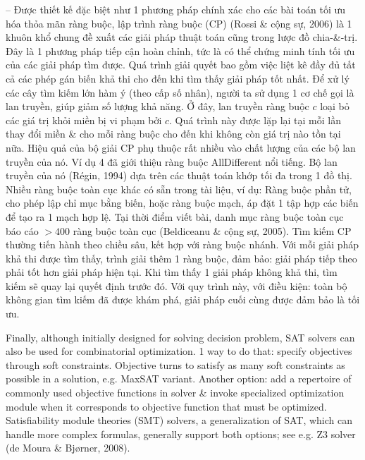 \documentclass{article}
\begin{document}
\begin{itemize}
\begin{itemize}
\begin{itemize}
\begin{itemize}
                -- Được thiết kế đặc biệt như 1 phương pháp chính xác cho các bài toán tối ưu hóa thỏa mãn ràng buộc, lập trình ràng buộc (CP) (Rossi \& cộng sự, 2006) là 1 khuôn khổ chung đề xuất các giải pháp thuật toán cũng trong lược đồ chia-\&-trị. Đây là 1 phương pháp tiếp cận hoàn chỉnh, tức là có thể chứng minh tính tối ưu của các giải pháp tìm được. Quá trình giải quyết bao gồm việc liệt kê đầy đủ tất cả các phép gán biến khả thi cho đến khi tìm thấy giải pháp tốt nhất. Để xử lý các cây tìm kiếm lớn hàm ý (theo cấp số nhân), người ta sử dụng 1 cơ chế gọi là lan truyền, giúp giảm số lượng khả năng. Ở đây, lan truyền ràng buộc $c$ loại bỏ các giá trị khỏi miền bị vi phạm bởi $c$. Quá trình này được lặp lại tại mỗi lần thay đổi miền \& cho mỗi ràng buộc cho đến khi không còn giá trị nào tồn tại nữa. Hiệu quả của bộ giải CP phụ thuộc rất nhiều vào chất lượng của các bộ lan truyền của nó. Ví dụ 4 đã giới thiệu ràng buộc AllDifferent nổi tiếng. Bộ lan truyền của nó (Régin, 1994) dựa trên các thuật toán khớp tối đa trong 1 đồ thị. Nhiều ràng buộc toàn cục khác có sẵn trong tài liệu, ví dụ: Ràng buộc phần tử, cho phép lập chỉ mục bằng biến, hoặc ràng buộc mạch, áp đặt 1 tập hợp các biến để tạo ra 1 mạch hợp lệ. Tại thời điểm viết bài, danh mục ràng buộc toàn cục báo cáo $> 400$ ràng buộc toàn cục (Beldiceanu \& cộng sự, 2005). Tìm kiếm CP thường tiến hành theo chiều sâu, kết hợp với ràng buộc nhánh. Với mỗi giải pháp khả thi được tìm thấy, trình giải thêm 1 ràng buộc, đảm bảo: giải pháp tiếp theo phải tốt hơn giải pháp hiện tại. Khi tìm thấy 1 giải pháp không khả thi, tìm kiếm sẽ quay lại quyết định trước đó. Với quy trình này, với điều kiện: toàn bộ không gian tìm kiếm đã được khám phá, giải pháp cuối cùng được đảm bảo là tối ưu.

                Finally, although initially designed for solving decision problem, SAT solvers can also be used for combinatorial optimization. 1 way to do that: specify objectives through soft constraints. Objective turns to satisfy as many soft constraints as possible in a solution, e.g. MaxSAT variant. Another option: add a repertoire of commonly used objective functions in solver \& invoke specialized optimization module when it corresponds to objective function that must be optimized. Satisfiability module theories (SMT) solvers, a generalization of SAT, which can handle more complex formulas, generally support both options; see e.g. Z3 solver (de Moura \& Bjørner, 2008).


\end{itemize}
\end{itemize}
\end{itemize}
\end{itemize}
\end{document}
